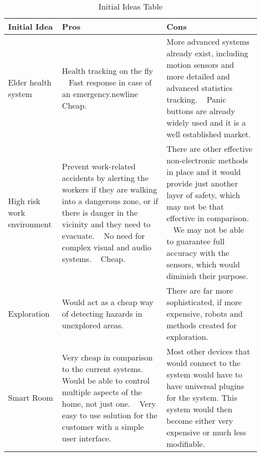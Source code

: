 \documentclass[../document.tex]{subfiles}
\begin{document}
\begin{table}[H]
\caption{Initial Ideas Table}
\centering
\begin{tabularx}{\textwidth}{ |X|X|X|}
\hline
\textbf{Initial Idea}
&
\textbf{Pros}
&
\textbf{Cons}
\\ \hline
Elder health system
&
Health tracking on the fly 
\newline \ \newline
Fast response in case of an emergency.newline 
\newline \ \newline
Cheap.
&
More advanced systems already exist, including motion sensors and more detailed and advanced statistics tracking.
\newline \ \newline
Panic buttons are already widely used and it is a well established market.
\\ \hline
High risk work environment
&
Prevent work-related accidents by alerting the workers if they are walking into a dangerous zone, or if there is danger in the vicinity and they need to evacuate.  
\newline \ \newline
No need for complex visual and audio systems. 
\newline \ \newline
Cheap.
&
There are other effective non-electronic methods in place and it would provide just another layer of safety, which may not be that effective in comparison.
 \newline \ \newline
We may not be able to guarantee full accuracy with the sensors, which would diminish their purpose.
\\ \hline
Exploration
&
Would act as a cheap way of detecting hazards in unexplored areas.
&
There are far more sophisticated, if more expensive, robots and methods created for exploration.
\\ \hline
Smart Room
&
Very cheap in comparison to the current systems.
 \newline \ \newline
Would be able to control multiple aspects of the home, not just one.
 \newline \ \newline
Very easy to use solution for the customer with a simple user interface. 
&
Most other devices that would connect to the system would have to have universal plugins for the system. This system would then become either very expensive or much less modifiable.
\\ \hline
\end{tabularx}
\end{table}
\end{document}
